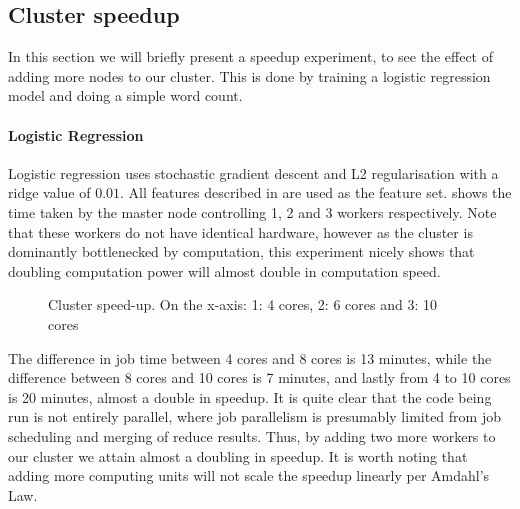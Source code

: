 \subsection{Cluster speedup}\label{sec:speedup}
In this section we will briefly present a speedup experiment, to see the effect of adding more nodes to our cluster. This is done by training a logistic regression model and doing a simple word count. 

\paragraph{Logistic Regression}
Logistic regression uses stochastic gradient descent and L2 regularisation with a ridge value of $0.01$. All features described in  are used as the feature set.  shows the time taken by the master node controlling 1, 2 and 3 workers respectively. Note that these workers do not have identical hardware, however as the cluster is dominantly bottlenecked by computation, this experiment nicely shows that doubling computation power will almost double in computation speed.


\begin{figure}[!htb]
  \centering
   \caption{Cluster speed-up. On the x-axis: 1: 4 cores, 2: 6 cores and 3: 10 cores}\label{fig:cluster-speedup}
\end{figure}
The difference in job time between 4 cores and 8 cores is 13 minutes, while the difference between 8 cores and 10 cores is 7 minutes, and lastly from 4 to 10 cores is 20 minutes, almost a double in speedup. It is quite clear that the code being run is not entirely parallel, where job parallelism is presumably limited from job scheduling and merging of reduce results. Thus, by adding two more workers to our cluster we attain almost a doubling in speedup. It is worth noting that adding more computing units will not scale the speedup linearly per Amdahl's Law.

